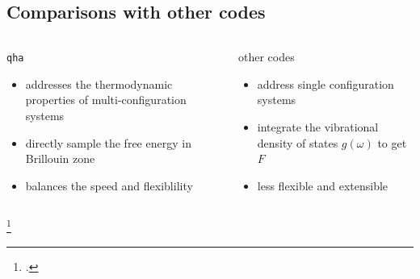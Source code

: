 \documentclass[13pt,aspectratio=169]{beamer}
\begin{document}
\subsection{Comparisons with other codes}
\begin{frame}{\subsecname}
	\begin{columns}
		\begin{column}{0.45\textwidth}
			\texttt{qha}\\
			\begin{itemize}[<+(1)->]
				\item addresses the thermodynamic properties of multi-configuration systems
				\item directly sample the free energy in Brillouin zone
				\item balances the speed and flexiblility
			\end{itemize}
		\end{column}

		\begin{column}{0.45\textwidth}
			other codes\\
			\begin{itemize}
				\item address single configuration systems
				\item integrate the vibrational density of states $g(\omega)$ to get $F$\footnotemark
				\item less flexible and extensible\footnotemark
			\end{itemize}
		\end{column}
	\end{columns}
	\setcounter{footnote}{5}
	\footcitetext{Petretto:2018gg}
\end{frame}
\end{document}
